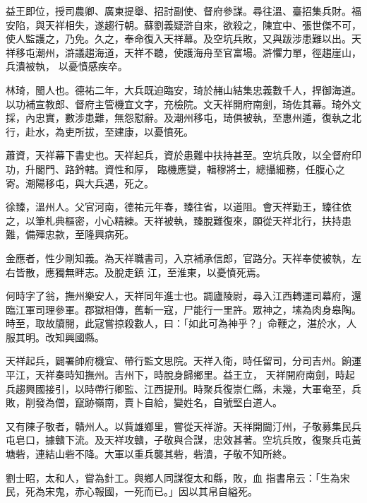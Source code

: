 \begin{pinyinscope}
 益王即位，授司農卿、廣東提舉、招討副使、督府參謀。尋往溫、臺招集兵財。福安陷，與天祥相失，遂趨行朝。蘇劉義疑滸自來，欲殺之，陳宜中、張世傑不可，使人監護之，乃免。久之，奉命復入天祥幕。及空坑兵敗，又與跋涉患難以出。天祥移屯潮州，滸議趨海道，天祥不聽，使護海舟至官富場。滸懼力單，徑趨崖山，兵潰被執，
 以憂憤感疾卒。



 林琦，閩人也。德祐二年，大兵既迫臨安，琦於赭山結集忠義數千人，捍御海道。以功補宣教郎、督府主管機宜文字，充檢院。文天祥開府南劍，琦佐其幕。琦外文採，內忠實，數涉患難，無怨懟辭。及潮州移屯，琦俱被執，至惠州遁，復執之北行，赴水，為吏所拔，至建康，以憂憤死。



 蕭資，天祥幕下書史也。天祥起兵，資於患難中扶持甚至。空坑兵敗，以全督府印功，升閣門、路鈐轄。資性和厚，
 臨機應變，輯穆將士，總攝細務，任腹心之寄。潮陽移屯，與大兵遇，死之。



 徐臻，溫州人。父官河南，德祐元年春，臻往省，以道阻。會天祥勤王，臻往依之，以筆札典樞密，小心精練。天祥被執，臻脫難復來，願從天祥北行，扶持患難，備殫忠款，至隆興病死。



 金應者，性少剛知義。為天祥職書司，入京補承信郎，官路分。天祥奉使被執，左右皆散，應獨無畔志。及脫走鎮
 江，至淮東，以憂憤死焉。



 何時字了翁，撫州樂安人，天祥同年進士也。調廬陵尉，尋入江西轉運司幕府，還臨江軍司理參軍。郡獄相傳，舊斬一寇，尸能行一里許。眾神之，塐為肉身皋陶。時至，取故牘閱，此寇嘗掠殺數人，曰：「如此可為神乎？」命鞭之，湛於水，人服其明。改知興國縣。



 天祥起兵，闢署帥府機宜、帶行監文思院。天祥入衛，時任留司，分司吉州。餉運平江，天祥奏時知撫州。吉州下，時脫身歸鄉里。益王立，
 天祥開府南劍，時起兵趨興國接引，以時帶行卿監、江西提刑。時聚兵復崇仁縣，未幾，大軍奄至，兵敗，削發為僧，竄跡嶺南，賣卜自給，變姓名，自號堅白道人。



 又有陳子敬者，贛州人。以貲雄鄉里，嘗從天祥游。天祥開閫汀州，子敬募集民兵屯皂口，據贛下流。及天祥攻贛，子敬與合謀，忠效甚著。空坑兵敗，復聚兵屯黃塘砦，連結山砦不降。大軍以重兵襲其砦，砦潰，子敬不知所終。



 劉士昭，太和人，嘗為針工。與鄉人同謀復太和縣，敗，血
 指書帛云：「生為宋民，死為宋鬼，赤心報國，一死而已。」因以其帛自縊死。




\end{pinyinscope}
